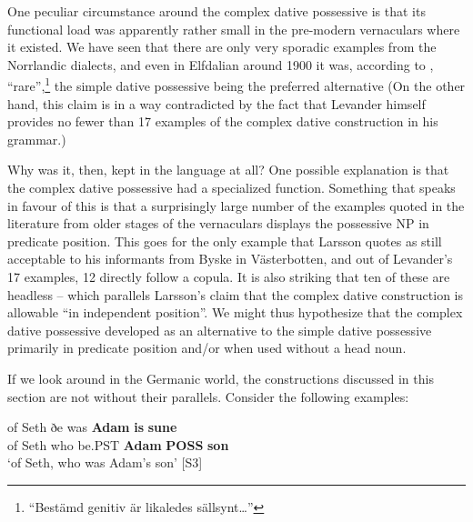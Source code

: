 {{%

One peculiar circumstance around the complex dative possessive is that its functional load was apparently rather small in the pre-modern vernaculars where it existed. We have seen that there are only very sporadic examples from the Norrlandic dialects, and even in Elfdalian around 1900 it was, according to \citet[98-99]{Levander1909}, “rare”,\footnote{ “Bestämd genitiv är likaledes sällsynt…”} the simple dative possessive being the preferred alternative (On the other hand, this claim is in a way contradicted by the fact that Levander himself provides no fewer than 17 examples of the complex dative construction in his grammar.) 


Why was it, then, kept in the language at all? One possible explanation is that the complex dative possessive had a specialized function. Something that speaks in favour of this is that a surprisingly large number of the examples quoted in the literature from older stages of the vernaculars displays the possessive NP in predicate position. This goes for the only example that Larsson quotes as still acceptable to his informants from Byske in Västerbotten, and out of Levander’s 17 examples, 12 directly follow a copula. It is also striking that ten of these are headless – which parallels Larsson’s claim that the complex dative construction is allowable “in independent position”. We might thus hypothesize that the complex dative possessive developed as an alternative to the simple dative possessive primarily in predicate position and/or when used without a head noun. 


If we look around in the Germanic world, the constructions discussed in this section are not without their parallels. Consider the following examples: 


\ea\label{}
\gll of  Seth  ðe  was  \textbf{Adam} \textbf{is} \textbf{sune}\\
of  Seth  who  be.PST  \textbf{Adam} \textbf{POSS} \textbf{son}\\
\glt ‘of Seth, who was Adam’s son’ [S3]
\z

}}
